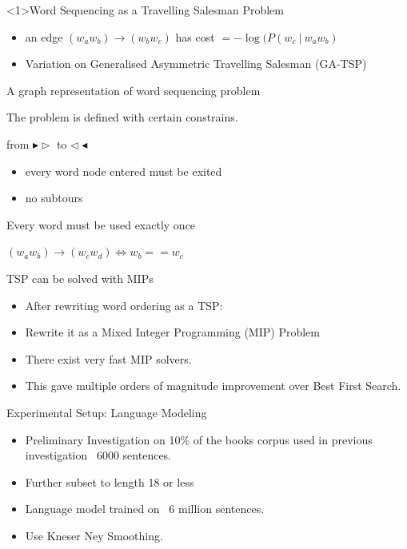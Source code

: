 \documentclass[]{beamer}
\newcommand{\widthtikz}[2]{\resizebox{#1\textwidth}{!}{}}
\newcommand{\fullwidthtikz}[1]{\resizebox{0.9\textwidth}{!}{}}
\begin{document}
\begin{frame}<1>{Word Sequencing as a Travelling Salesman Problem}
	\widthtikz{0.5}{../figs/ordergraphpaper}
	\begin{itemize}
		\item an edge $(w_aw_b)\to (w_bw_c)$ has cost $=-\log(P(w_c\:|\:w_aw_b)$
		\item Variation on Generalised Asymmetric Travelling Salesman (GA-TSP)
	\end{itemize}
\end{frame}

\begin{frame}{A graph representation of word sequencing problem}
	\fullwidthtikz{../figs/ordergraphpaper}
\end{frame}

\begin{frame}{The problem is defined with certain constrains.}
	\widthtikz{0.5}{../figs/ordergraphpaper}
	\begin{description}
		\item<1-> [Single Path] from $\blacktriangleright\triangleright$ to $\triangleleft\blacktriangleleft$
		\begin{itemize}
			\item every word node entered must be exited
			\item no subtours
		\end{itemize}
		\item<2-> [Districts] Every word must be used exactly once
		\item<3-> [Markov Consistency] $(w_aw_b)\to (w_cw_d) \iff w_b==w_c$
	\end{description}
\end{frame}



\begin{frame}{TSP can be solved with MIPs}
	\begin{itemize}
		\item After rewriting word ordering as a TSP:
		\item Rewrite it as a Mixed Integer Programming (MIP) Problem
		\item There exist very fast MIP solvers.
		\item This gave multiple orders of magnitude improvement over Best First Search.
	\end{itemize}
\end{frame}

\begin{frame}{Experimental Setup: Language Modeling}
	\begin{itemize}
		\item<1-> Preliminary Investigation on 10\% of the books corpus used in previous investigation ~6000 sentences.
		\item<1-> Further subset to length 18 or less
		\vfill
		\item<2-> Language model trained on ~6 million sentences.
		\item<2-> Use Kneser Ney Smoothing. 
		
	\end{itemize}
\end{frame}
\end{document}
